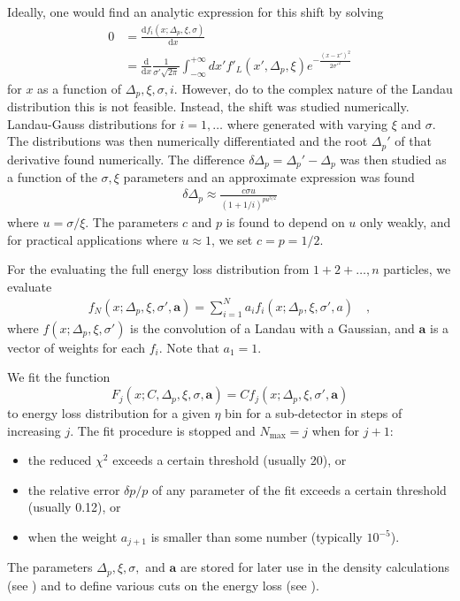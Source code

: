 Ideally, one would find an analytic expression for this shift by
solving
\begin{align*}
  0 &= \frac{\text{d} f_i(x;\Delta_p,\xi,\sigma)}{\text{d}x}\nonumber\\
    &= \frac{\text{d}}{\text{d}x}\frac{1}{\sigma' \sqrt{2 \pi}}
     \int_{-\infty}^{+\infty} dx' f'_{L}(x',\Delta_p,\xi)
     e^{-\frac{(x-x')^2}{2\sigma'^2}}
\end{align*}
for $x$ as a function of $\Delta_p,\xi,\sigma,i$. However, do to the
complex nature of the Landau distribution this is not
feasible. Instead, the shift was studied numerically. Landau-Gauss
distributions for $i=1,\ldots$ where generated with varying $\xi$ and
$\sigma$.  The distributions was then numerically differentiated and
the root $\Delta_p'$ of that derivative found numerically.  The
difference $\delta\Delta_p=\Delta_p'-\Delta_p$ was then studied as a
function of the $\sigma,\xi$ parameters and an approximate expression
was found
\begin{align}
  \delta\Delta_p \approx \frac{c \sigma u}{(1+1/i)^{p u^{3/2}}}
\end{align}
where $ u=\sigma/\xi$.  The parameters $c$ and $p$ is
found to depend on $ u$ only weakly, and for practical
applications where $u\approx1$, we set $ c=p=1/2$. 

For the evaluating the full energy loss distribution from
$1+2+\ldots,n$ particles, we evaluate
\begin{align}
  f_N(x;\Delta_p,\xi,\sigma',\mathbf{a})=\sum_{i=1}^N a_i
  f_i(x;\Delta_p,\xi,\sigma',a)\quad,
\end{align}
where $ f(x;\Delta_p,\xi,\sigma')$ is the convolution of a Landau with
a Gaussian, and $\mathbf{a}$ is a vector of weights for each $
f_i$. Note that $a_1 = 1$.

We fit the function 
$$
F_j(x;C,\Delta_p,\xi,\sigma,\mathbf{a}) = C
f_j(x;\Delta_p,\xi,\sigma',\mathbf{a})
$$
to energy loss distribution for a given $\eta$ bin for a sub-detector
in steps of increasing $j$.  The fit procedure is stopped and
$N_{\text{max}}=j$ when for
$j+1$: 
\begin{itemize}
\item the reduced $\chi^2$ exceeds a certain threshold (usually 20), or
\item the relative error $\delta p/p$ of any parameter of the fit
  exceeds a certain threshold (usually 0.12), or 
\item when the weight $a_{j+1}$ is smaller than some number (typically
  $10^{-5}$). 
\end{itemize}
The parameters $\Delta_p,\xi,\sigma,$ and $\mathbf{a}$ are stored for
later use in the density calculations (see
) and to define various cuts on
the energy loss (see ). 

